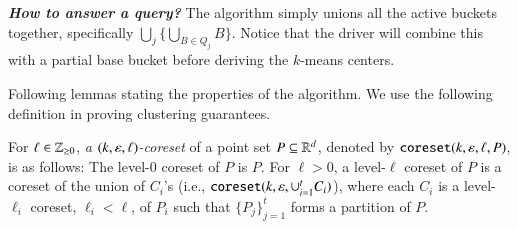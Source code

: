 

\noindent{}\emph{\textbf{How to answer a query?}}  The algorithm simply unions all the active buckets together, specifically
$\bigcup_{j} \{\bigcup_{B \in Q_j} B \}$.  Notice that the driver will combine
this with a partial base bucket before deriving the $k$-means centers.

Following lemmas stating the properties of the \ct algorithm. We use the following definition in proving clustering guarantees.
\begin{definition}
  For $\ell \in {\ensuremath{\mathbb{Z}}}_{\geq 0}$, \emph{a $(k,\varepsilon, \ell)$-coreset} of a point set
  $P \subseteq {\ensuremath{\mathbb{R}}}^d$, denoted by $\texttt{coreset}(k, \varepsilon, \ell, P)$, is as follows:
The level-$0$ coreset of $P$ is $P$. %
For $\ell > 0$, a level-$\ell$ coreset of $P$ is a coreset of the union
of $C_i$'s (i.e., $\texttt{coreset}(k, \varepsilon, \cup_{i=1}^t C_i)$), where each
$C_i$ is a level-$\ell_i$ coreset, $\ell_i < \ell$, of $P_i$ such that
$\{P_j\}_{j=1}^t$ forms a partition of $P$.
\end{definition}

